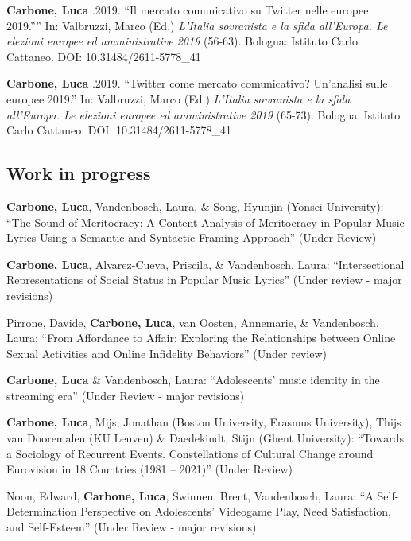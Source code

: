 \documentclass[12pt,]{article}
\begin{document}
\textbf{Carbone, Luca} .2019. ``Il mercato comunicativo su Twitter nelle
europee 2019.'''' In: Valbruzzi, Marco (Ed.) \emph{L'Italia sovranista e
la sfida all'Europa. Le elezioni europee ed amministrative 2019}
(56-63). Bologna: Istituto Carlo Cattaneo. DOI: 10.31484/2611-5778\_41

\textbf{Carbone, Luca} .2019. ``Twitter come mercato comunicativo?
Un'analisi sulle europee 2019.'' In: Valbruzzi, Marco (Ed.)
\emph{L'Italia sovranista e la sfida all'Europa. Le elezioni europee ed
amministrative 2019} (65-73). Bologna: Istituto Carlo Cattaneo. DOI:
10.31484/2611-5778\_41 \newline

\hypertarget{work-in-progress}{%
\subsection{Work in progress}\label{work-in-progress}}

\textbf{Carbone, Luca}, Vandenbosch, Laura, \& Song, Hyunjin (Yonsei
University): ``The Sound of Meritocracy: A Content Analysis of
Meritocracy in Popular Music Lyrics Using a Semantic and Syntactic
Framing Approach'' (Under Review) \newline

\textbf{Carbone, Luca}, Alvarez-Cueva, Priscila, \& Vandenbosch, Laura:
``Intersectional Representations of Social Status in Popular Music
Lyrics'' (Under review - major revisions) \newline

Pirrone, Davide, \textbf{Carbone, Luca}, van Oosten, Annemarie, \&
Vandenbosch, Laura: ``From Affordance to Affair: Exploring the
Relationships between Online Sexual Activities and Online Infidelity
Behaviors'' (Under review) \newline

\textbf{Carbone, Luca} \& Vandenbosch, Laura: ``Adolescents' music
identity in the streaming era'' (Under Review - major revisions)
\newline

\textbf{Carbone, Luca}, Mijs, Jonathan (Boston University, Erasmus
University), Thijs van Dooremalen (KU Leuven) \& Daedekindt, Stijn
(Ghent University): ``Towards a Sociology of Recurrent Events.
Constellations of Cultural Change around Eurovision in 18 Countries
(1981 -- 2021)'' (Under Review) \newline

Noon, Edward, \textbf{Carbone, Luca}, Swinnen, Brent, Vandenbosch,
Laura: ``A Self-Determination Perspective on Adolescents' Videogame
Play, Need Satisfaction, and Self-Esteem'' (Under Review - major
revisions) \newline
\end{document}
